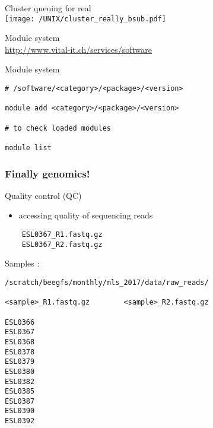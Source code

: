 \documentclass[xcolor=dvipsnames]{beamer}
\begin{document}
\begin{frame}
	\begin{center}
		\Huge
		Cluster queuing for real\\
		\vspace{1cm}
		\texttt{[image: /UNIX/cluster\_really\_bsub.pdf]}
	\end{center}
\end{frame}

\begin{frame}
	\begin{center}
		\Huge
		Module system\\
		\vspace{1cm}
		\Large
		\url{http://www.vital-it.ch/services/software}
	\end{center}
\end{frame}

\begin{frame}[fragile]
\begin{center}
\Huge
Module system\\
\vspace{1cm}
\large
\begin{verbatim}
# /software/<category>/<package>/<version>

module add <category>/<package>/<version>

# to check loaded modules

module list
\end{verbatim}
\end{center}
\end{frame}

\begin{frame}
	\frametitle{Finally genomics!}
	Quality control (QC)
	\large
	\begin{itemize}
		\item accessing quality of sequencing reads
	\end{itemize}
\end{frame}

\begin{frame}[fragile]
\begin{verbatim}
	ESL0367_R1.fastq.gz
	ESL0367_R2.fastq.gz
\end{verbatim}
\end{frame}

\begin{frame}[fragile]
\large
Samples :
\begin{verbatim}
/scratch/beegfs/monthly/mls_2017/data/raw_reads/

<sample>_R1.fastq.gz        <sample>_R2.fastq.gz

ESL0366
ESL0367
ESL0368
ESL0378
ESL0379
ESL0380
ESL0382
ESL0385
ESL0387
ESL0390
ESL0392
\end{verbatim}
\end{frame}
\end{document}
